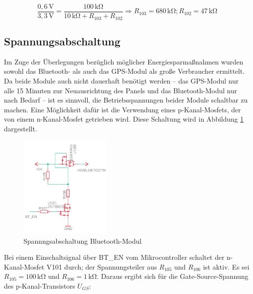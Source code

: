 \begin{minipage}{\textwidth}
\begin{equation}\label{eq:Spannungsteiler5vb}
\frac {0,6\,\si{\volt}}{3,3\,\si{\volt}}{=}  \frac{100\,\si{\kilo\ohm}}{10\,\si{\kilo\ohm}+R_{103}+R_{102}} \Rightarrow R_{103}=680\,\si{\kilo\ohm}; R_{102}=47\,\si{\kilo\ohm}
\end{equation}
\end{minipage}



\subsection{Spannungsabschaltung}\label{subsec.Spannungsabschaltung}
Im Zuge der Überlegungen bezüglich möglicher Energiesparmaßnahmen wurden sowohl das Bluetooth- als auch das GPS-Modul als große Verbraucher ermittelt. Da beide Module auch nicht dauerhaft benötigt werden -- das GPS-Modul nur alle 15 Minuten zur Neuausrichtung des Panels und das Bluetooth-Modul nur nach Bedarf -- ist es sinnvoll, die Betriebsspannungen beider Module schaltbar zu machen. Eine Möglichkeit dafür ist die Verwendung eines p-Kanal-Mosfets, der von einem n-Kanal-Mosfet getrieben wird. Diese Schaltung wird in Abbildung \ref{fig.spgsabschaltung} dargestellt.

\begin{figure}[H]
  \centering
  \includegraphics[width=0.4\textwidth]{./img/spannungsabschaltung.png}
  \caption{Spannngsabschaltung Bluetooth-Modul}\label{fig.spgsabschaltung}
\end{figure}

Bei einem Einschaltsignal über BT\_EN vom Mikrocontroller schaltet der n-Kanal-Mosfet V101 durch; der Spannungsteiler aus $R_{105}$ und $R_{106}$ ist aktiv. Es sei $R_{105}=100\,\si{\kilo\ohm}$ und $R_{106}=1\,\si{\kilo\ohm}$. Daraus ergibt sich für die Gate-Source-Spannung des p-Kanal-Transistors $U_{GS}$:

